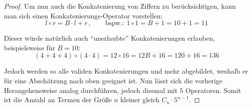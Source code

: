 \documentclass{article}
\theoremstyle{nonumberplain}
\newtheorem{proof}{Beweis}
\begin{document}
\begin{proof}
    Um nun auch die Konkatenierung von Ziffern zu berücksichtigen, kann man sich einen Konkatenierungs-Operator vorstellen:
    \[l \circ r = B \cdot l + r \,,\quad\quad\text{bspw.: } 1\circ1 = B + 1 = 10 + 1 = 11\]
    
    Dieser würde natürlich auch ``unerlaubte'' Konkatenierungen erlauben, beispielsweise für \(B=10\):
     \[(4+4+4) \circ (4\cdot4) = 12 \circ 16 = 12B + 16 = 120 + 16 = 136\]

    Jedoch werden so alle validen Konkatenierungen und mehr abgebildet, weshalb er für eine Abschätzung nach oben geeignet ist.
    Nun lässt sich die vorherige Herangehensweise analog durchführen, jedoch diesmal mit \(5\) Operatoren.
    Somit ist die Anzahl an Termen der Größe \(n\) kleiner gleich \(C_n \cdot 5^{n-1}\).
\end{proof}
\end{document}
